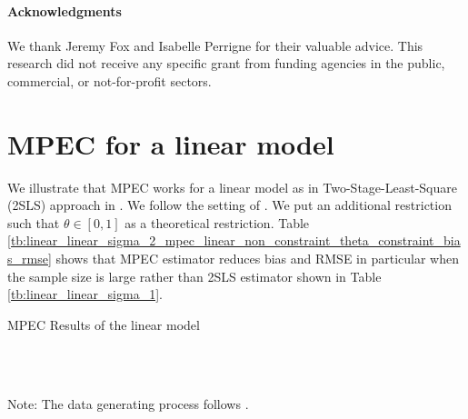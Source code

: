 \documentclass[11pt, a4paper]{article}
\begin{document}
\paragraph{Acknowledgments}
We thank Jeremy Fox and Isabelle Perrigne for their valuable advice. This research did not receive any specific grant from funding agencies in the public, commercial, or not-for-profit sectors. 

\newpage




\newpage
\appendix

\section{MPEC for a linear model}

We illustrate that MPEC works for a linear model as in Two-Stage-Least-Square (2SLS) approach in \cite{matsumura2023revisiting}. 
We follow the setting of \cite{matsumura2023revisiting}.
We put an additional restriction such that $\theta\in[0,1]$ as a theoretical restriction. Table \ref{tb:linear_linear_sigma_2_mpec_linear_non_constraint_theta_constraint_bias_rmse} shows that MPEC estimator reduces bias and RMSE in particular when the sample size is large rather than 2SLS estimator shown in Table \ref{tb:linear_linear_sigma_1}.



\begin{table}[!htbp]
  \begin{center}
      \caption{MPEC Results of the linear model}
      \label{tb:linear_linear_sigma_2_mpec_linear_non_constraint_theta_constraint_bias_rmse} 
      \subfloat[$\sigma=0.001$]{}\\
      \subfloat[$\sigma=0.5$]{}\\
    \subfloat[$\sigma=2.0$]{}
  \end{center}
  \footnotesize
  Note: The data generating process follows \cite{matsumura2023revisiting}.
\end{table} 
\end{document}
